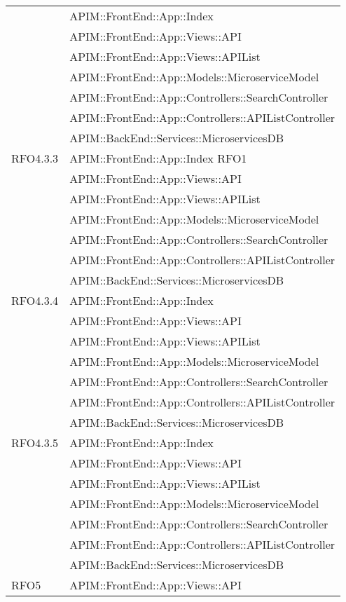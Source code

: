 \begin{longtable}{ p{4cm} | p{12cm} }
			& APIM::FrontEnd::App::Index \\
			& APIM::FrontEnd::App::Views::API \\
			& APIM::FrontEnd::App::Views::APIList \\
			& APIM::FrontEnd::App::Models::MicroserviceModel \\
			& APIM::FrontEnd::App::Controllers::SearchController \\
			& APIM::FrontEnd::App::Controllers::APIListController \\
			& APIM::BackEnd::Services::MicroservicesDB \\
			\hline
			RFO4.3.3
			& APIM::FrontEnd::App::Index RFO1 \\
			& APIM::FrontEnd::App::Views::API \\
			& APIM::FrontEnd::App::Views::APIList \\
			& APIM::FrontEnd::App::Models::MicroserviceModel \\
			& APIM::FrontEnd::App::Controllers::SearchController \\
			& APIM::FrontEnd::App::Controllers::APIListController \\
			& APIM::BackEnd::Services::MicroservicesDB \\
			\hline		
			RFO4.3.4
			& APIM::FrontEnd::App::Index \\
			& APIM::FrontEnd::App::Views::API \\
			& APIM::FrontEnd::App::Views::APIList \\
			& APIM::FrontEnd::App::Models::MicroserviceModel \\
			& APIM::FrontEnd::App::Controllers::SearchController \\
			& APIM::FrontEnd::App::Controllers::APIListController \\
			& APIM::BackEnd::Services::MicroservicesDB \\
			\hline		
			RFO4.3.5
			& APIM::FrontEnd::App::Index \\
			& APIM::FrontEnd::App::Views::API \\
			& APIM::FrontEnd::App::Views::APIList \\
			& APIM::FrontEnd::App::Models::MicroserviceModel \\
			& APIM::FrontEnd::App::Controllers::SearchController \\
			& APIM::FrontEnd::App::Controllers::APIListController \\
			& APIM::BackEnd::Services::MicroservicesDB \\
			\hline		
			RFO5
			& APIM::FrontEnd::App::Views::API \\

\end{longtable}
